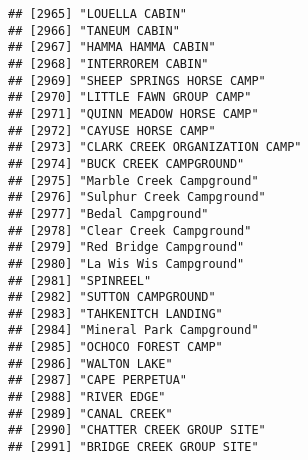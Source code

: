 \documentclass[
]{article}
\begin{document}
\begin{verbatim}
## [2965] "LOUELLA CABIN"                                                                       
## [2966] "TANEUM CABIN"                                                                        
## [2967] "HAMMA HAMMA CABIN"                                                                   
## [2968] "INTERROREM CABIN"                                                                    
## [2969] "SHEEP SPRINGS HORSE CAMP"                                                            
## [2970] "LITTLE FAWN GROUP CAMP"                                                              
## [2971] "QUINN MEADOW HORSE CAMP"                                                             
## [2972] "CAYUSE HORSE CAMP"                                                                   
## [2973] "CLARK CREEK ORGANIZATION CAMP"                                                       
## [2974] "BUCK CREEK CAMPGROUND"                                                               
## [2975] "Marble Creek Campground"                                                             
## [2976] "Sulphur Creek Campground"                                                            
## [2977] "Bedal Campground"                                                                    
## [2978] "Clear Creek Campground"                                                              
## [2979] "Red Bridge Campground"                                                               
## [2980] "La Wis Wis Campground"                                                               
## [2981] "SPINREEL"                                                                            
## [2982] "SUTTON CAMPGROUND"                                                                   
## [2983] "TAHKENITCH LANDING"                                                                  
## [2984] "Mineral Park Campground"                                                             
## [2985] "OCHOCO FOREST CAMP"                                                                  
## [2986] "WALTON LAKE"                                                                         
## [2987] "CAPE PERPETUA"                                                                       
## [2988] "RIVER EDGE"                                                                          
## [2989] "CANAL CREEK"                                                                         
## [2990] "CHATTER CREEK GROUP SITE"                                                            
## [2991] "BRIDGE CREEK GROUP SITE"                                                             

\end{verbatim}
\end{document}
